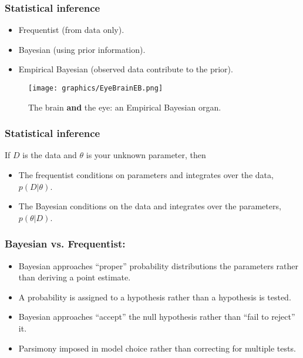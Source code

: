 \documentclass{beamer}
\newcommand{\1}{\ensuremath{\mathbf{1}}}
\begin{document}
%
%
%
\begin{frame}\frametitle{Statistical inference}
	\begin{itemize}
		\item Frequentist (from data only).
		\item Bayesian (using prior information).
		\item Empirical Bayesian (observed data contribute to the prior).
	\end{itemize}
	\begin{figure}
	\begin{center}
		\texttt{[image: graphics/EyeBrainEB.png]}
	\end{center}
	\caption{The brain \textbf{and} the eye: an Empirical Bayesian organ.}
	\end{figure}
\end{frame}
%
%
%
\begin{frame}\frametitle{Statistical inference}
	If $D$ is the data and $\theta$ is your unknown parameter, then
	\begin{itemize}
		\item The frequentist conditions on parameters and integrates over the data, $p(D|\theta)$.
		\item The Bayesian conditions on the data and integrates over the parameters, $p(\theta|D)$.
	\end{itemize}
\end{frame}
%
%
%
\begin{frame}\frametitle{Bayesian vs. Frequentist:}
	\begin{itemize}
		\item Bayesian approaches ``proper'' probability distributions the parameters rather than deriving a point estimate.
		\item A probability is assigned to a hypothesis rather than a hypothesis is tested.
		\item Bayesian approaches ``accept'' the null hypothesis rather than ``fail to reject'' it.
		\item Parsimony imposed in model choice rather than correcting for multiple tests.
	\end{itemize}
\end{frame}
\end{document}

